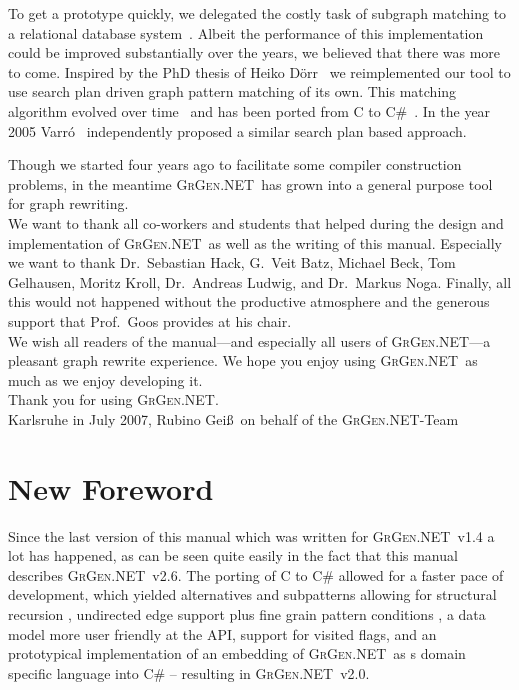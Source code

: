 \documentclass[a4paper,final,11pt]{book}
\providecommand{\GrG}{{\scshape GrGen.NET}}
\begin{document}
To get a prototype quickly, we delegated the costly task of subgraph matching to a relational database system~\cite{Hac:03}.
Albeit the performance of this implementation could be improved substantially over the years, we believed that there was more to come.
Inspired by the PhD thesis of Heiko D\"orr~\cite{doerr} we reimplemented our tool to use search plan driven graph pattern matching of its own.
This matching algorithm evolved over time~\cite{adam,Bat:05:SA,Bat:05:DA,Bat:06,BKG:07} and has been ported from C to C\#~\cite{KG:07,Kro:07}. 
In the year 2005 Varr\'o~\cite{gramot2005_adapt} independently proposed a similar search plan based approach.

Though we started four years ago to facilitate some compiler construction problems, in the meantime \GrG\ has grown into a general purpose tool for graph rewriting.\\[3ex]

We want to thank all co-workers and students that helped during the design and implementation of \GrG\ as well as the writing of this manual.
Especially we want to thank Dr.~Sebastian Hack, G.~Veit Batz, Michael Beck, Tom Gelhausen, Moritz Kroll, Dr.~Andreas Ludwig, and Dr.~Markus Noga.
Finally, all this would not happened without the productive atmosphere and the generous support that Prof.~Goos provides at his chair.\\[3ex]

We wish all readers of the manual---and especially all users of \GrG---a pleasant graph rewrite experience.
We hope you enjoy using \GrG\ as much as we enjoy developing it.\\[3ex]

Thank you for using \GrG.\\[6ex]

\noindent Karlsruhe in July 2007, Rubino Gei\ss~on behalf of the \GrG-Team


\chapter*{New Foreword}

Since the last version of this manual which was written for \GrG\ v1.4 a lot has happened, 
as can be seen quite easily in the fact that this manual describes \GrG\ v2.6.
The porting of C to C\# \cite{Kro:07} allowed for a faster pace of development,
which yielded alternatives and subpatterns allowing for structural recursion \cite{Jak:08,StructuralRecursion},
undirected edge support plus fine grain pattern conditions \cite{SABuchwald:2008}, 
a data model more user friendly at the API, support for visited flags, 
and an prototypical implementation of an embedding of \GrG\ as s domain specific language into C\# \cite{DAMoritz}
-- resulting in \GrG\ v2.0.
\medskip
\end{document}

